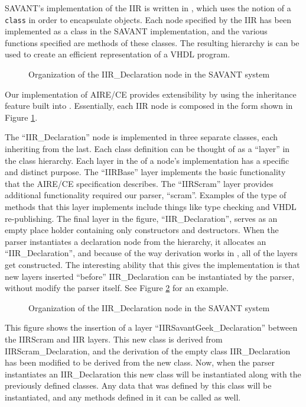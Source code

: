\documentclass[11pt]{article}
\begin{document}
SAVANT's implementation of the IIR is written in \Cpp, which uses the
notion of a \texttt{class} in order to encapsulate objects.  Each node
specified by the IIR has been implemented as a class in the SAVANT
implementation, and the various functions specified are methods of these
classes.  The resulting hierarchy is can be used to create an efficient
representation of a VHDL program.

\begin{figure}
\centerline{} 
\caption{Organization of the IIR\_Declaration node in the SAVANT
system}\label{node-implementation} 
\end{figure}

Our implementation of AIRE/CE provides extensibility by using the inheritance
feature built into \Cpp.  Essentially, each IIR node is composed in the form
shown in Figure \ref{node-implementation}.

The ``IIR\_Declaration'' node is implemented in three separate classes, each
inheriting from the last.  Each class definition can be thought of as a
``layer'' in the class hierarchy.  Each layer in the of a node's
implementation has a specific and distinct purpose.  The ``IIRBase'' layer
implements the basic functionality that the AIRE/CE specification describes.
The ``IIRScram'' layer provides additional functionality required our
parser, ``scram''.  Examples of the type of methods that this layer
implements include things like type checking and VHDL re-publishing.  The
final layer in the figure, ``IIR\_Declaration'', serves as an empty place
holder containing only constructors and destructors.  When the parser
instantiates a declaration node from the hierarchy, it allocates an
``IIR\_Declaration'', and because of the way derivation works in \Cpp, all of
the layers get constructed.  The interesting ability that this gives the
implementation is that new layers inserted ``before'' IIR\_Declaration can
be instantiated by the parser, without modify the parser itself.  See
Figure \ref{broken-derivation} for an example.

\begin{figure}
\centerline{}
\caption{Organization of the IIR\_Declaration node in the SAVANT
system}\label{broken-derivation} 
\end{figure}

This figure shows the insertion of a layer ``IIRSavantGeek\_Declaration''
between the IIRScram and IIR layers.  This new class is derived from
IIRScram\_Declaration, and the derivation of the empty class
IIR\_Declaration has been modified to be derived from the new class.  Now,
when the parser instantiates an IIR\_Declaration this new class will be
instantiated along with the previously defined classes.  Any data that was
defined by this class will be instantiated, and any methods defined in it
can be called as well.
\end{document}
